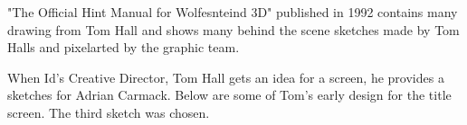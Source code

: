 \documentclass[book.tex]{subfiles}
\begin{document}
\begin{minipage}{0.7\textwidth}
 "The Official Hint Manual for Wolfesnteind 3D" published in 1992 contains many drawing from Tom Hall and shows many behind the scene sketches made by Tom Halls and pixelarted by the graphic team.\\
\par
 \begin{fancyquotes}
When Id's Creative Director, Tom Hall gets an idea for a screen, he provides a sketches for Adrian Carmack. Below are some of Tom's early design for the title screen. The third sketch was chosen.\\
\end{fancyquotes}
\end{minipage}
\begin{minipage}{0.3\textwidth}
\begin{flushright}
\end{flushright}
\end{minipage}

\noindent
   \begin{figure}[H]
\centering
 \end{figure}
 \par
   \begin{figure}[H]
\centering
\end{figure} 



\begin{figure}[H]
\centering    
   \end{figure}

     \begin{figure}[H]
\centering
   \end{figure}
 
  \begin{figure}[H]
\centering
 \\
 \end{figure}








      \begin{minipage}{.48\textwidth}
  \end{minipage}
      \begin{minipage}{.48\textwidth}
  \end{minipage}
\end{document}
